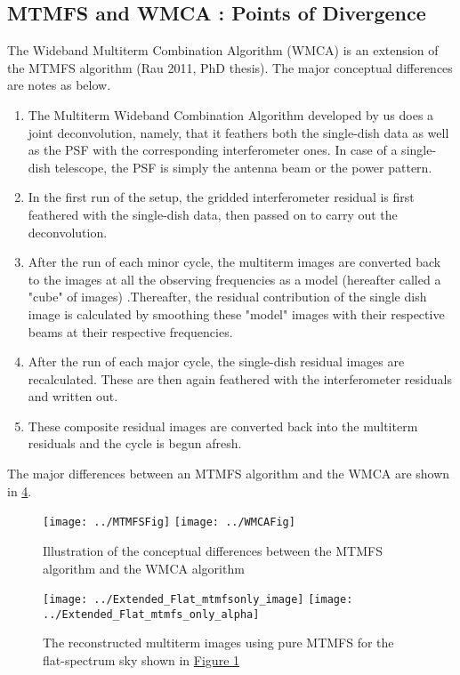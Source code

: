 \documentclass[twocolumn]{aastex61}
\begin{document}
\subsection{MTMFS and WMCA : Points of Divergence}
The Wideband Multiterm Combination Algorithm (WMCA) is an extension of the MTMFS algorithm (Rau 2011, PhD thesis). The major conceptual differences are notes as below.
\begin{enumerate}
\item The Multiterm Wideband Combination Algorithm developed by us does a joint deconvolution, namely, that it feathers both the single-dish data as well as the PSF with the corresponding interferometer ones. In case of a single-dish telescope, the PSF is simply the antenna beam or the power pattern.
\item In the first run of the setup, the gridded interferometer residual is first feathered with the single-dish data, then passed on to carry out the deconvolution.
\item After the run of each minor cycle, the multiterm images are converted back to the images at all the observing frequencies as a model (hereafter called a "cube" of images) .Thereafter, the residual contribution of the single dish image is calculated by smoothing these "model" images with their respective beams at their respective frequencies. 
\item After the run of each major cycle, the single-dish residual images are recalculated. These are then again feathered with the interferometer residuals and written out. 
\item These composite residual images are converted back into the multiterm residuals and the cycle is begun afresh.
\end{enumerate}
The major differences between an MTMFS algorithm and the WMCA are shown in \hyperref[ 4]{\figurename{ 4}}.
\begin{figure}
\centering
\texttt{[image: ../MTMFSFig]}
\texttt{[image: ../WMCAFig]}
\caption{Illustration of the conceptual differences between the MTMFS algorithm and the WMCA algorithm}
\label{ 4}
\end{figure}
\begin{figure}
\centering
\texttt{[image: ../Extended\_Flat\_mtmfsonly\_image]}
\texttt{[image: ../Extended\_Flat\_mtmfs\_only\_alpha]}
\caption{The reconstructed multiterm images using pure MTMFS for the flat-spectrum sky shown in \hyperref[ 1]{Figure 1}}
\label{ 5}
\end{figure}
\end{document}
